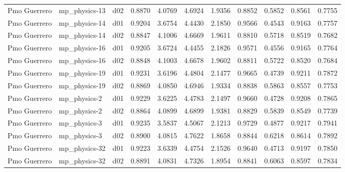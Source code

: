 \begin{longtable}{lllrrrrrrrr}
         Pmo Guerrero  &         mp\_physics-13 &     d02 &   0.8870 &   4.0769 &   4.6924 &       1.9356 &        0.8852 &       0.5852 &           0.8561 &  0.7755 \\
         Pmo Guerrero  &         mp\_physics-14 &     d01 &   0.9204 &   3.6754 &   4.4430 &       2.1850 &        0.9566 &       0.4543 &           0.9163 &  0.7757 \\
         Pmo Guerrero  &         mp\_physics-14 &     d02 &   0.8847 &   4.1006 &   4.6669 &       1.9611 &        0.8810 &       0.5718 &           0.8519 &  0.7682 \\
         Pmo Guerrero  &         mp\_physics-16 &     d01 &   0.9205 &   3.6724 &   4.4455 &       2.1826 &        0.9571 &       0.4556 &           0.9165 &  0.7764 \\
         Pmo Guerrero  &         mp\_physics-16 &     d02 &   0.8848 &   4.1003 &   4.6678 &       1.9602 &        0.8811 &       0.5722 &           0.8520 &  0.7684 \\
         Pmo Guerrero  &         mp\_physics-19 &     d01 &   0.9231 &   3.6196 &   4.4804 &       2.1477 &        0.9665 &       0.4739 &           0.9211 &  0.7872 \\
         Pmo Guerrero  &         mp\_physics-19 &     d02 &   0.8869 &   4.0850 &   4.6946 &       1.9334 &        0.8838 &       0.5863 &           0.8557 &  0.7753 \\
         Pmo Guerrero  &          mp\_physics-2 &     d01 &   0.9229 &   3.6225 &   4.4783 &       2.1497 &        0.9660 &       0.4728 &           0.9208 &  0.7865 \\
         Pmo Guerrero  &          mp\_physics-2 &     d02 &   0.8864 &   4.0899 &   4.6899 &       1.9381 &        0.8829 &       0.5839 &           0.8549 &  0.7739 \\
         Pmo Guerrero  &          mp\_physics-3 &     d01 &   0.9235 &   3.5837 &   4.5067 &       2.1213 &        0.9729 &       0.4877 &           0.9217 &  0.7941 \\
         Pmo Guerrero  &          mp\_physics-3 &     d02 &   0.8900 &   4.0815 &   4.7622 &       1.8658 &        0.8844 &       0.6218 &           0.8614 &  0.7892 \\
         Pmo Guerrero  &         mp\_physics-32 &     d01 &   0.9223 &   3.6339 &   4.4754 &       2.1526 &        0.9640 &       0.4713 &           0.9197 &  0.7850 \\
         Pmo Guerrero  &         mp\_physics-32 &     d02 &   0.8891 &   4.0831 &   4.7326 &       1.8954 &        0.8841 &       0.6063 &           0.8597 &  0.7834 \\

\end{longtable}
